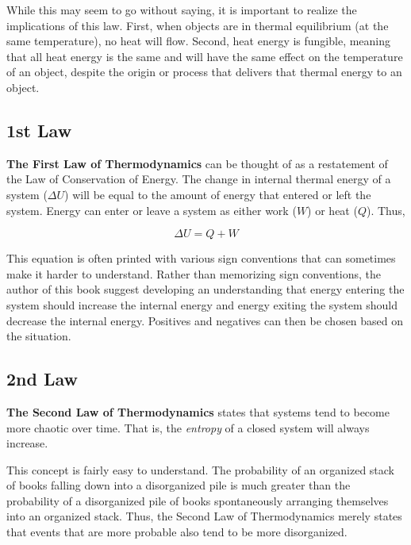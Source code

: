 	While this may seem to go without saying, it is important to realize the implications of this law.  First, when objects are in thermal equilibrium (at the same temperature), no heat will flow.  Second, heat energy is fungible, meaning that all heat energy is the same and will have the same effect on the temperature of an object, despite the origin or process that delivers that thermal energy to an object.
	
	\subsection{1st Law}
		
		\textbf{The First Law of Thermodynamics} can be thought of as a restatement of the Law of Conservation of Energy. The change in internal thermal energy of a system ($\Delta U$) will be equal to the amount of energy that entered or left the system.  Energy can enter or leave a system as either work ($W$) or heat ($Q$).  Thus,
		
		\begin{mdframed}[backgroundcolor=orange!20!white]
		\begin{equation}
				\Delta U = Q + W
				\label{eqn:firstlawofthermo}
		\end{equation}
		\end{mdframed}
			
This equation is often printed with various sign conventions that can sometimes make it harder to understand.  Rather than memorizing sign conventions, the author of this book suggest developing an understanding that energy entering the system should increase the internal energy and energy exiting the system should decrease the internal energy.  Positives and negatives can then be chosen based on the situation.  

	
	\subsection{2nd Law} 
			\textbf{The Second Law of Thermodynamics} states that systems tend to become more chaotic over time.  That is, the \textit{entropy} of a closed system will always increase.  
			
			This concept is fairly easy to understand.  The probability of an organized stack of books falling down into a disorganized pile is much greater than the probability of a disorganized pile of books spontaneously arranging themselves into an organized stack.  Thus, the Second Law of Thermodynamics merely states that events that are more probable also tend to be more disorganized.  
			
